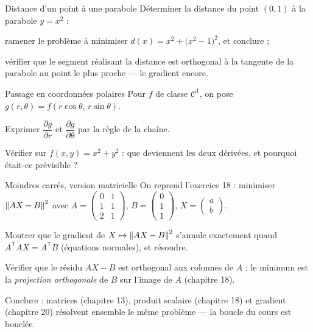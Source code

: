 \begin{exercice}[3]{Distance d'un point à une parabole}
Déterminer la distance du point $(0,1)$ à la parabole $y=x^{2}$ :
\begin{questions}
  \item ramener le problème à minimiser
    $d(x)=x^{2}+\bigl(x^{2}-1\bigr)^{2}$, et conclure ;
  \item vérifier que le segment réalisant la distance est orthogonal à la
    tangente de la parabole au point le plus proche — le gradient encore.
\end{questions}
\end{exercice}

\begin{exercice}[3]{Passage en coordonnées polaires}
Pour $f$ de classe $\mathcal{C}^{1}$, on pose
$g(r,\theta)=f(r\cos\theta,\,r\sin\theta)$.
\begin{questions}
  \item Exprimer $\dfrac{\partial g}{\partial r}$ et
    $\dfrac{\partial g}{\partial\theta}$ par la règle de la chaîne.
  \item Vérifier sur $f(x,y)=x^{2}+y^{2}$ : que deviennent les deux
    dérivées, et pourquoi était-ce prévisible ?
\end{questions}
\end{exercice}

\begin{exercice}[3]{Moindres carrés, version matricielle}
On reprend l'exercice 18 : minimiser
$\left\lVert AX-B\right\rVert^{2}$ avec
$A=\begin{pmatrix}0&1\\1&1\\2&1\end{pmatrix}$,
$B=\begin{pmatrix}0\\1\\1\end{pmatrix}$,
$X=\begin{pmatrix}a\\b\end{pmatrix}$.
\begin{questions}
  \item Montrer que le gradient de $X\mapsto\left\lVert AX-B\right\rVert^{2}$ s'annule
    exactement quand $A^{\mathsf T}AX=A^{\mathsf T}B$ (équations
    normales), et résoudre.
  \item Vérifier que le résidu $AX-B$ est orthogonal aux colonnes de
    $A$ : le minimum est la \emph{projection orthogonale} de $B$ sur
    l'image de $A$ (chapitre 18).
  \item Conclure : matrices (chapitre 13), produit scalaire
    (chapitre 18) et gradient (chapitre 20) résolvent ensemble le même
    problème — la boucle du cours est bouclée.
\end{questions}
\end{exercice}


